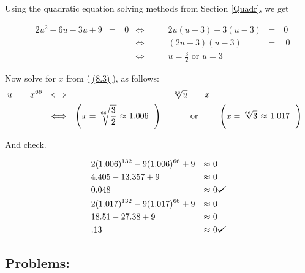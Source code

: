\documentclass{book}
\theoremstyle{definition}
\def\checkmark{\tikz\fill[scale=0.4](0,.35) -- (.25,0) -- (1,.7) -- (.25,.15) -- cycle;}
\begin{document}
Using the quadratic equation solving methods from Section \ref{Quadr}, we get

\begin{equation}
\label{(8.3)}
\begin{align*}
&2u^2-6u-3u+9&=&\ 0&\Longleftrightarrow&\qquad 2u(u-3)-3(u-3)&=\ &0 \\
&&\phantom{=}&\phantom0&\Longleftrightarrow&\qquad (2u-3)(u-3)&=&\ 0 \\
&&\phantom{=}&\phantom0&\Longleftrightarrow&\qquad 
u=\frac{3}{2}\text{ or } u=3 
\end{align*}
\end{equation}

Now solve for $x$ from (\ref{(8.3)}), as follows:
\begin{equation}
\label{(8.3)}
\begin{align*}
& u&=&\ x^{66}&\Longleftrightarrow&&&&&&\ \sqrt[66]{u}\ &=\ x& \\
&&\phantom{=}&\phantom0&\Longleftrightarrow&
&\left(x=\sqrt[66]{\frac32}\right.&\approx\hspace{-.1in}&1.006&\left.\phantom{\sqrt[66]{\frac11}}\hspace{-.25in}\right)&
&\text{or}&&\left(x=\phantom{\sqrt[66]{\frac32}}\hspace{-.3in}\sqrt[66]3\right. \hspace{-.1in} &\approx&
\ 1.017 \hspace{-.25in} \left.\phantom{\sqrt[66]{\frac32}}\right)
\end{align*}
\end{equation}
                
                
    

And check.

\begin{equation}
\label{(8.4)}
\begin{align*}
&2(1.006)^{132}-9(1.006)^{66}+9 &\approx&\ 0 \\
&4.405-13.357+9 &\approx&\ 0 \\
&0.048 &\approx&\ 0 \checkmark{} \\
&2(1.017)^{132}-9(1.017)^{66}+9 &\approx&\ 0 \\
&18.51-27.38+9 &\approx&\ 0 \\
&.13 &\approx&\ 0 \checkmark{}
\end{align*}    
\end{equation}
     

\subsection{Problems:}
\end{document}
